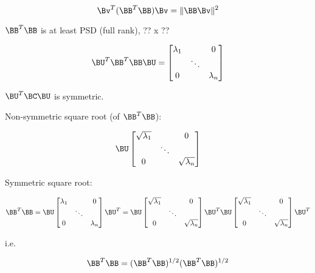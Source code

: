 \begin{equation} \label{eq:A.5}
\Bv^{T}(\BB^{T}\BB)\Bv = \|\BB\Bv\|^{2} 
\end{equation}

$\BB^{T}\BB$ is at least PSD (full rank), ?? x ??

\begin{equation} \label{eq:A.6}
\BU^{T}\BB^{T}\BB\BU = \begin{bmatrix}
\lambda_1 & & 0 \\
 & \ddots & \\
0 & & \lambda_n
\end{bmatrix}
\end{equation}

$\BU^{T}\BC\BU$ is symmetric.

Non-symmetric square root (of $\BB^{T}\BB$):

\begin{equation} \label{eq:A.7}
\BU\begin{bmatrix}
\sqrt{\lambda_1} & & 0 \\
 & \ddots & \\
0 & & \sqrt{\lambda_n}
\end{bmatrix}
\end{equation}

Symmetric square root:

\begin{equation} \label{eq:A.8}
\BB^{T}\BB = \BU\begin{bmatrix}
\lambda_1 & & 0 \\
 & \ddots & \\
0 & & \lambda_n
\end{bmatrix}\BU^{T} = \BU\begin{bmatrix}
\sqrt{\lambda_1} & & 0 \\
 & \ddots & \\
0 & & \sqrt{\lambda_n}
\end{bmatrix}\BU^{T}\BU\begin{bmatrix}
\sqrt{\lambda_1} & & 0 \\
 & \ddots & \\
0 & & \sqrt{\lambda_n}
\end{bmatrix}\BU^{T}
\end{equation}

i.e.

\begin{equation} \label{eq:A.9}
\BB^{T}\BB = (\BB^{T}\BB)^{1/2}(\BB^{T}\BB)^{1/2}
\end{equation}

